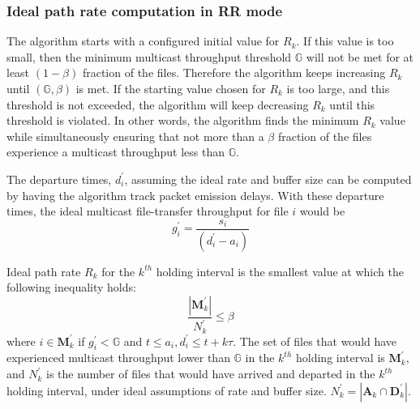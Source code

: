 \subsubsection{Ideal path rate computation in RR mode}
\label{sec:rate-RR}
The algorithm starts with a configured initial value for $R_k$.
If this value is too small, then the minimum multicast throughput
threshold $\mathbb{G}$ will not be met for at least $(1-\beta)$ fraction of the files. Therefore the algorithm keeps increasing $R_k$ until
$(\mathbb{G},\beta)$ is met.
If the starting value chosen for $R_k$ is too large, and this threshold is not exceeded, the algorithm will
keep decreasing $R_k$ until this threshold is violated. In other words, the algorithm finds the minimum $R_k$ value while simultaneously ensuring that not more than a $\beta$ fraction of the files experience a multicast throughput less than $\mathbb{G}$.

The departure times, $d^{\prime}_i$, assuming the ideal
rate and buffer size can be computed by having the algorithm
track packet emission delays. With these departure times,
the ideal multicast file-transfer throughput for file $i$ would be
\begin{equation} \label{eqn:file-throughput}
g^{\prime}_i = \frac{s_i}{(d^{\prime}_i - a_i)}
\end{equation}

Ideal path rate $R_k$ for the $k^{th}$ holding interval is the smallest value at which the following inequality holds:
\begin{equation} \frac{\left\vert{\textbf{M}^{\prime}_k}\right\vert}{N^{\prime}_k}  \le \beta
\end{equation}
where $i \in \textbf{M}^{\prime}_k$ if $g^{\prime}_i < \mathbb{G}$
and $t \leq a_i, d^{\prime}_i \leq t+k\tau$.
The set of files that would have experienced multicast throughput lower than $\mathbb{G}$ in the $k^{th}$ holding interval is $\textbf{M}^{\prime}_k$, and $N^{\prime}_k$ is the number of
files that would have arrived and departed in the $k^{th}$ holding interval, under ideal assumptions of rate and buffer size.
$N^{\prime}_k = \left\vert\textbf{A}_k \cap \textbf{D}^{\prime}_k\right\vert$.


